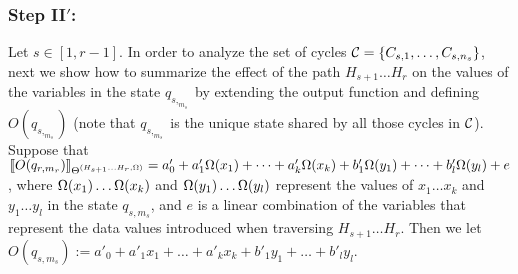 \vspace{-3mm}
\subsubsection{Step II$'$:}
Let $s\in [1,r-1]$. In order to analyze the set of cycles ${\mathcal{C} }=\{C_{s,1},\dots,C_{s,n_{s}}\}$, next we show how to summarize the effect of the path $H_{s+1}\dots H_r$ on the values of the variables in the state $q_{s,_{m_s}}$ by extending the output function and defining $O(q_{s,_{m_s}})$ (note that $q_{s,_{m_s}}$ is the unique state shared by all those cycles in ${\mathcal{C} }$).
Suppose that $\llbracket O(q_{r,m_r})\rrbracket_{\Theta^{(H_{s+1}\dots H_{r}, \Omega)}}=a'_0+a'_1 \Omega(x_1)+ \dots + a'_k \Omega(x_k) + b'_1 \Omega(y_1) + \dots + b'_l \Omega(y_l)+e$, where $\Omega(x_1)\dots\Omega(x_k)$ and $\Omega(y_1)\ldots \Omega(y_l)$ represent the values of $x_1\dots x_k$ and $y_1 \dots y_l$ in the state $q_{s, m_{s}}$, and $e$ is a linear combination of the variables that represent the data values introduced when traversing $H_{s+1}\dots H_r$. 
Then we let
$O(q_{s, m_{s}}):=a'_0+a'_1 x_1 + \dots + a'_k x_k + b'_1 y_1 + \dots + b'_l y_l$.

